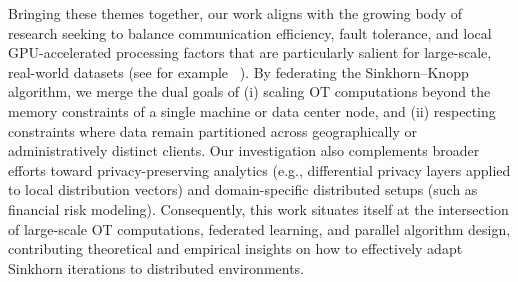 Bringing these themes together, our work aligns with the growing body of research seeking to balance communication efficiency, fault tolerance, and local GPU-accelerated processing factors that are particularly salient for large-scale, real-world datasets (see for example ~\cite{chetlur2014cudnn}). By federating the Sinkhorn–Knopp algorithm, we merge the dual goals of (i) scaling OT computations beyond the memory constraints of a single machine or data center node, and (ii) respecting constraints where data remain partitioned across geographically or administratively distinct clients. Our investigation also complements broader efforts toward privacy-preserving analytics (e.g., differential privacy layers applied to local distribution vectors) and domain-specific distributed setups (such as financial risk modeling). Consequently, this work situates itself at the intersection of large-scale OT computations, federated learning, and parallel algorithm design, contributing theoretical and empirical insights on how to effectively adapt Sinkhorn iterations to distributed environments.